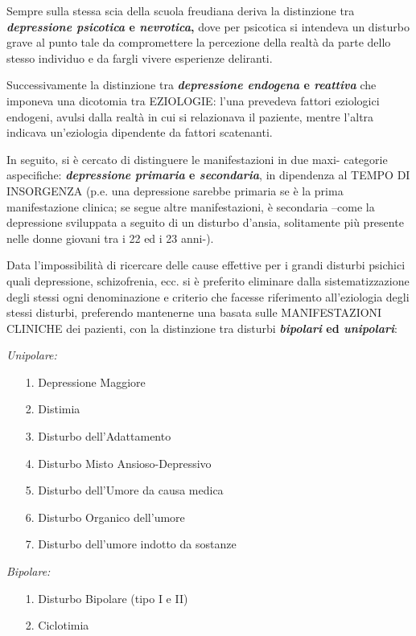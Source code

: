 Sempre sulla stessa scia della scuola freudiana deriva la distinzione
tra \textbf{\emph{depressione psicotica} e \emph{nevrotica},} dove per
psicotica si intendeva un disturbo grave al punto tale da compromettere
la percezione della realtà da parte dello stesso individuo e da fargli
vivere esperienze deliranti.

Successivamente la distinzione tra \textbf{\emph{depressione endogena} e
\emph{reattiva}} che imponeva una dicotomia tra EZIOLOGIE: l'una
prevedeva fattori eziologici endogeni, avulsi dalla realtà in cui si
relazionava il paziente, mentre l'altra indicava un'eziologia dipendente
da fattori scatenanti.

In seguito, si è cercato di distinguere le manifestazioni in due maxi-
categorie aspecifiche: \textbf{\emph{depressione} \emph{primaria} e
\emph{secondaria}}, in dipendenza al TEMPO DI INSORGENZA (p.e. una
depressione sarebbe primaria se è la prima manifestazione clinica; se
segue altre manifestazioni, è secondaria --come la depressione
sviluppata a seguito di un disturbo d'ansia, solitamente più presente
nelle donne giovani tra i 22 ed i 23 anni-).

Data l'impossibilità di ricercare delle cause effettive per i grandi
disturbi psichici quali depressione, schizofrenia, ecc. si è preferito
eliminare dalla sistematizzazione degli stessi ogni denominazione e
criterio che facesse riferimento all'eziologia degli stessi disturbi,
preferendo mantenerne una basata sulle MANIFESTAZIONI CLINICHE dei
pazienti, con la distinzione tra disturbi \textbf{\emph{bipolari} ed
\emph{unipolari}}:

\emph{Unipolare: }

\begin{itemize}
\item[1.]
  Depressione Maggiore
\item[2.]
  Distimia
\item[3.]
  Disturbo dell'Adattamento
\item[4.]
  Disturbo Misto Ansioso-Depressivo
\item[5.]
  Disturbo dell'Umore da causa medica
\item[6.]
  Disturbo Organico dell'umore
\item[7.]
  Disturbo dell'umore indotto da sostanze
\end{itemize}

\emph{Bipolare:}

\begin{itemize}
\item[1.]
  Disturbo Bipolare (tipo I e II)
\item[2.]
  Ciclotimia
\end{itemize}

